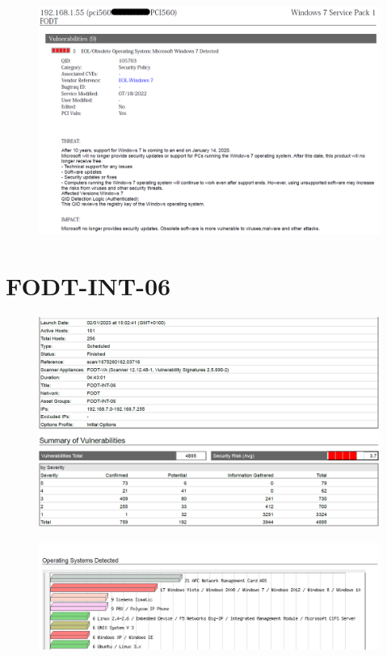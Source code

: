 \documentclass[target=bach,aauheader=]{thud}
\begin{document}
\begin{figure}[h]
    \centering
    \includegraphics[width=1\linewidth]{images/FODT-INT-01a_2.png}
    \caption{}
    \label{fig:fodt-int-01a_2}
\end{figure}

\pagebreak

\section{FODT-INT-06}

\begin{figure}[h]
    \centering
    \includegraphics[width=1\linewidth]{images/FODT-INT-06_1.png}
    \caption{}
    \label{fig:fodt-int-06_1}
\end{figure}

\begin{figure}[h]
    \centering
    \includegraphics[width=1\linewidth]{images/FODT-INT-06_2.png}
    \caption{}
    \label{fig:fodt-int-06_2}
\end{figure}
\end{document}
